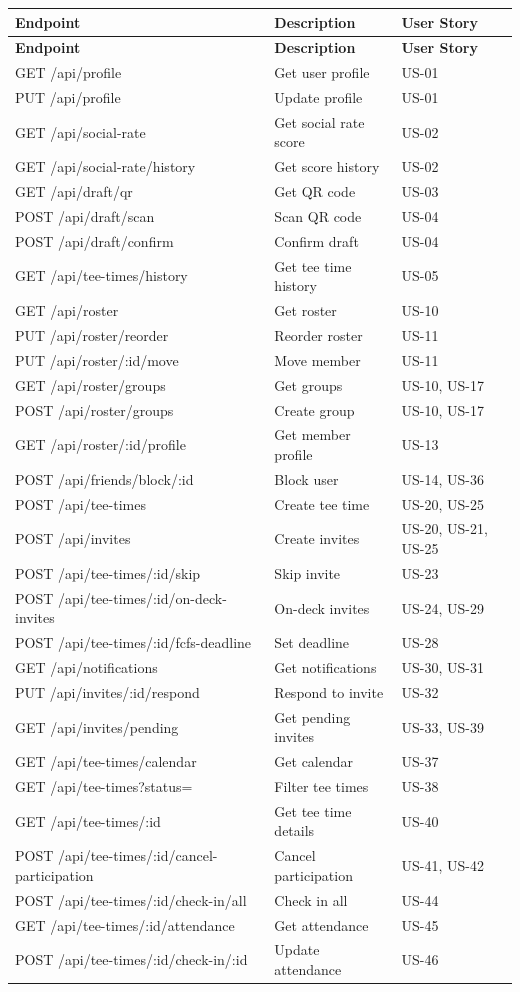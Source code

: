 \documentclass[11pt,a4paper]{article}
\begin{document}
\begin{longtable}{|p{4cm}|p{6cm}|p{4cm}|}
\hline
\textbf{Endpoint} & \textbf{Description} & \textbf{User Story} \\
\hline
\endfirsthead
\hline
\textbf{Endpoint} & \textbf{Description} & \textbf{User Story} \\
\hline
\endhead
GET /api/profile & Get user profile & US-01 \\
PUT /api/profile & Update profile & US-01 \\
GET /api/social-rate & Get social rate score & US-02 \\
GET /api/social-rate/history & Get score history & US-02 \\
GET /api/draft/qr & Get QR code & US-03 \\
POST /api/draft/scan & Scan QR code & US-04 \\
POST /api/draft/confirm & Confirm draft & US-04 \\
GET /api/tee-times/history & Get tee time history & US-05 \\
\hline
GET /api/roster & Get roster & US-10 \\
PUT /api/roster/reorder & Reorder roster & US-11 \\
PUT /api/roster/:id/move & Move member & US-11 \\
GET /api/roster/groups & Get groups & US-10, US-17 \\
POST /api/roster/groups & Create group & US-10, US-17 \\
GET /api/roster/:id/profile & Get member profile & US-13 \\
POST /api/friends/block/:id & Block user & US-14, US-36 \\
\hline
POST /api/tee-times & Create tee time & US-20, US-25 \\
POST /api/invites & Create invites & US-20, US-21, US-25 \\
POST /api/tee-times/:id/skip & Skip invite & US-23 \\
POST /api/tee-times/:id/on-deck-invites & On-deck invites & US-24, US-29 \\
POST /api/tee-times/:id/fcfs-deadline & Set deadline & US-28 \\
\hline
GET /api/notifications & Get notifications & US-30, US-31 \\
PUT /api/invites/:id/respond & Respond to invite & US-32 \\
GET /api/invites/pending & Get pending invites & US-33, US-39 \\
\hline
GET /api/tee-times/calendar & Get calendar & US-37 \\
GET /api/tee-times?status= & Filter tee times & US-38 \\
GET /api/tee-times/:id & Get tee time details & US-40 \\
\hline
POST /api/tee-times/:id/cancel-participation & Cancel participation & US-41, US-42 \\
POST /api/tee-times/:id/check-in/all & Check in all & US-44 \\
GET /api/tee-times/:id/attendance & Get attendance & US-45 \\
POST /api/tee-times/:id/check-in/:id & Update attendance & US-46 \\
\hline
\end{longtable}
\end{document}
